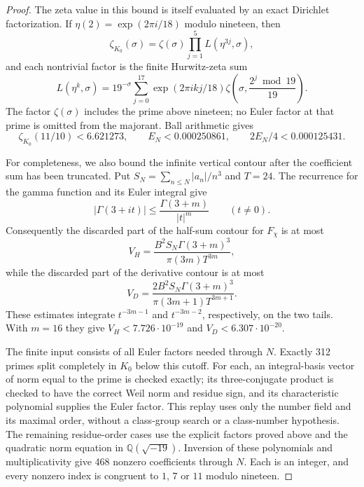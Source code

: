 \begin{proof}
The zeta value in this bound is itself evaluated by an exact
Dirichlet factorization. If $\eta(2)=\exp(2\pi i/18)$ modulo
nineteen, then
\[
 \zeta_{K_0}(\sigma)=\zeta(\sigma)
     \prod_{j=1}^5 L(\eta^{3j},\sigma),
\]
and each nontrivial factor is the finite Hurwitz-zeta sum
\[
 L(\eta^k,\sigma)=19^{-\sigma}
   \sum_{j=0}^{17}\exp(2\pi i k j/18)
        \zeta\!\left(\sigma,\frac{2^j\bmod19}{19}\right).
\]
The factor $\zeta(\sigma)$ includes the prime above nineteen;
no Euler factor at that prime is omitted from the majorant.
Ball arithmetic gives
\[
 \zeta_{K_0}(11/10)<6.621273,
 \qquad E_N<0.000250861,
 \qquad 2E_N/4<0.000125431.
\]

For completeness, we also bound the infinite vertical contour
after the coefficient sum has been truncated. Put
$S_N=\sum_{n\leq N}|a_n|/n^3$ and $T=24$.
The recurrence for the gamma function and its Euler integral give
\[
 |\Gamma(3+it)|
   \leq\frac{\Gamma(3+m)}{|t|^m}\qquad(t\ne0).
\]
Consequently the discarded part of the half-sum contour for
$F_\chi$ is at most
\[
 V_H=\frac{B^2S_N\Gamma(3+m)^3}
             {\pi(3m)T^{3m}},
\]
while the discarded part of the derivative contour is at most
\[
 V_D=\frac{2B^2S_N\Gamma(3+m)^3}
             {\pi(3m+1)T^{3m+1}}.
\]
These estimates integrate $t^{-3m-1}$ and $t^{-3m-2}$,
respectively, on the two tails. With $m=16$ they give
$V_H<7.726\cdot10^{-19}$ and
$V_D<6.307\cdot10^{-20}$.

The finite input consists of all Euler factors needed through
$N$. Exactly 312 primes split completely in $K_0$ below this
cutoff. For each, an integral-basis vector of norm equal to the
prime is checked exactly; its three-conjugate product is checked
to have the correct Weil norm and residue sign, and its
characteristic polynomial supplies the Euler factor. This replay
uses only the number field and its maximal order, without a
class-group search or a class-number hypothesis. The remaining
residue-order cases use the explicit factors proved above and
the quadratic norm equation in $\mathbb Q(\sqrt{-19})$.
Inversion of these polynomials and multiplicativity give 468
nonzero coefficients through $N$. Each is an integer, and every
nonzero index is congruent to $1$, $7$ or $11$ modulo nineteen.


\end{proof}
